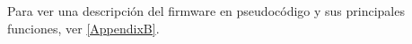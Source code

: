{Para ver una descripción del firmware en pseudocódigo y sus principales funciones, ver \ref{AppendixB}.


    




%	
%
%	


}

